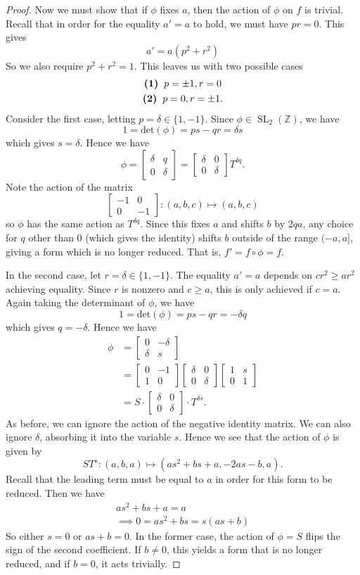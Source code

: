 \documentclass[honours,12pt]{unswthesis}
\newcommand{\Z}{\mathbb{Z}} %
\DeclareMathOperator{\SL}{SL}
\newcommand{\bmat}[1]{\begin{bmatrix}#1\end{bmatrix}}
\numberwithin{equation}{section}
\begin{document}
\begin{proof}
    Now we must show that if $\phi$ fixes $a$, then the action of $\phi$ on $f$ is trivial.
    Recall that in order for the equality $a' = a$ to hold, we must have $pr = 0$.
    This gives
    $$a' = a \left( p^2 + r^2 \right)$$
    So we also require $p^2 + r^2 = 1$.
    This leaves us with two possible cases
    \begin{gather*}
        \textbf{(1)} \hspace{2mm} p = \pm 1, r = 0 \\
        \textbf{(2)} \hspace{2mm} p = 0, r = \pm 1.
    \end{gather*}
    Consider the first case, letting $p = \delta \in \{1, -1\}$.
    Since $\phi \in \SL_2(\Z)$, we have
    $$1 = \text{det}(\phi) = ps - qr = \delta s$$
    which gives $s = \delta$.
    Hence we have
    $$\phi = \bmat{\delta & q \\ 0 & \delta} = \bmat{\delta & 0 \\ 0 & \delta} T^{\delta q}.$$
    Note the action of the matrix
    $$\bmat{-1 & 0 \\ 0 & -1} : (a, b, c) \mapsto (a, b, c)$$
    so $\phi$ has the same action as $T^{\delta q}$. 
    Since this fixes $a$ and shifts $b$ by $2qa$, any choice for $q$ other than 0 (which gives the identity)
    shifts $b$ outside of the range $(-a, a]$, giving a form which is no longer reduced.
    That is, $f' = f \circ \phi = f$.

    In the second case, let $r = \delta \in \{1, -1\}$. 
    The equality $a' = a$ depends on $cr^2 \geq ar^2$ achieving equality. 
    Since $r$ is nonzero and $c \geq a$, this is only achieved if $c = a$.
    Again taking the determinant of $\phi$, we have
    $$1 = \text{det}(\phi) = ps - qr = - \delta q$$
    which gives $q = - \delta$.
    Hence we have
    \begin{align*}
        \phi &= \bmat{0 & - \delta \\ \delta & s} \\ 
        &= \bmat{0 & -1 \\ 1 & 0} \bmat{\delta & 0 \\ 0 & \delta} \bmat{1 & s \\ 0 & 1} \\
        &= S \cdot \bmat{\delta & 0 \\ 0 & \delta} \cdot T^{\delta s}.
    \end{align*}
    As before, we can ignore the action of the negative identity matrix.
    We can also ignore $\delta$, absorbing it into the variable $s$.
    Hence we see that the action of $\phi$ is given by
    $$ST^s : (a, b, a) \mapsto (as^2 + bs + a, - 2as - b, a).$$
    Recall that the leading term must be equal to $a$ in order for this form to be reduced.
    Then we have
    \begin{gather*}
        as^2 + bs + a = a \\
        \implies 0 = as^2 + bs = s(as + b)
    \end{gather*}
    So either $s = 0$ or $as + b = 0$. 
    In the former case, the action of $\phi = S$ flips the sign of the second coefficient.
    If $b \neq 0$, this yields a form that is no longer reduced, and if $b = 0$, it acts trivially.
    

\end{proof}
\end{document}
